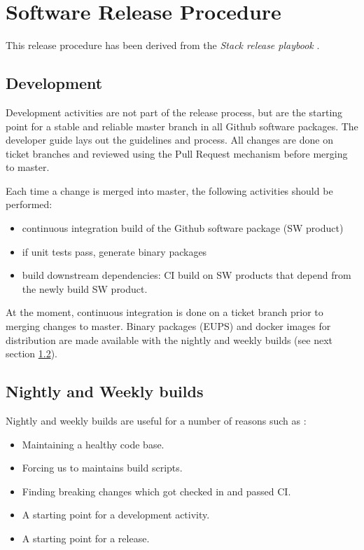 \newpage
\section{Software Release Procedure} \label{sec:releaseprocedure}

This release procedure has been derived from the \textit{Stack release playbook} .

\subsection{Development} \label{sec:dev}

Development activities are not part of the release process, but are the starting point for a stable and reliable master branch in all Github software packages.
The  developer guide lays out the guidelines and process. All changes are done on ticket branches and reviewed using the Pull Request mechanism before merging to master.

Each time a change is merged into master, the following activities should be performed:

\begin{itemize}
\item continuous integration build of the Github software package (SW product)
\item if unit tests pass, generate binary packages
\item build downstream dependencies: CI build on SW products that depend from the newly build SW product.
\end{itemize}

At the moment, continuous integration is done on a ticket branch prior to merging changes to master. Binary packages (EUPS) and docker images for distribution are made available with the nightly and weekly builds (see next section \ref{sec:weekly}).


\subsection{Nightly and Weekly builds} \label{sec:weekly}

Nightly and weekly builds are  useful for a number of reasons such as :
\begin{itemize}
	\item Maintaining a healthy code base.
	\item Forcing us to maintains build scripts.
	\item Finding breaking changes which got checked in and passed CI.
	\item A starting point for a development activity.
	\item A starting point for a release.
\end{itemize}

